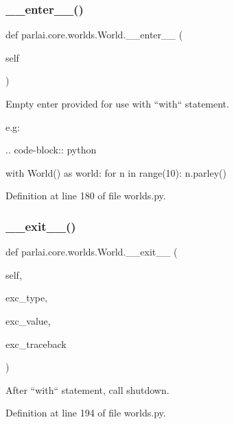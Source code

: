 \subsubsection{\texorpdfstring{\+\_\+\+\_\+enter\+\_\+\+\_\+()}{\_\_enter\_\_()}}
{\footnotesize\ttfamily def parlai.\+core.\+worlds.\+World.\+\_\+\+\_\+enter\+\_\+\+\_\+ (\begin{DoxyParamCaption}\item[{}]{self }\end{DoxyParamCaption})}

\begin{DoxyVerb}Empty enter provided for use with ``with`` statement.

e.g:

.. code-block:: python

    with World() as world:
for n in range(10):
    n.parley()
\end{DoxyVerb}
 

Definition at line 180 of file worlds.\+py.

\mbox{\label{classparlai_1_1core_1_1worlds_1_1World_ae2b8ea006564cbefbe8520f45fb71040}} 
\subsubsection{\texorpdfstring{\+\_\+\+\_\+exit\+\_\+\+\_\+()}{\_\_exit\_\_()}}
{\footnotesize\ttfamily def parlai.\+core.\+worlds.\+World.\+\_\+\+\_\+exit\+\_\+\+\_\+ (\begin{DoxyParamCaption}\item[{}]{self,  }\item[{}]{exc\+\_\+type,  }\item[{}]{exc\+\_\+value,  }\item[{}]{exc\+\_\+traceback }\end{DoxyParamCaption})}

\begin{DoxyVerb}After ``with`` statement, call shutdown.\end{DoxyVerb}
 

Definition at line 194 of file worlds.\+py.



